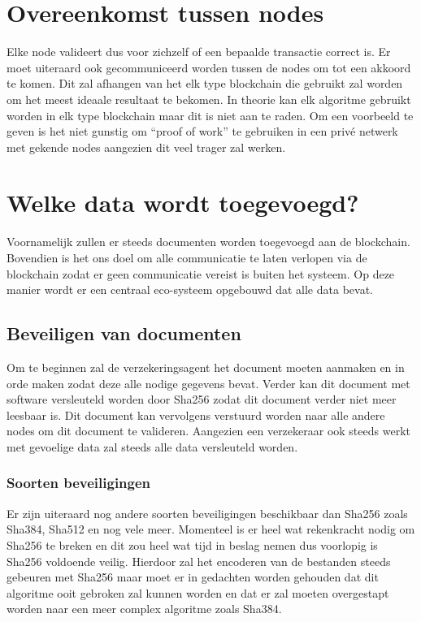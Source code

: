 \section{Overeenkomst tussen nodes}
Elke node valideert dus voor zichzelf of een bepaalde transactie correct is. Er moet uiteraard ook gecommuniceerd worden tussen de nodes om tot een akkoord te komen. Dit zal afhangen van het elk type blockchain die gebruikt zal worden om het meest ideaale resultaat te bekomen. In theorie kan elk algoritme gebruikt worden in elk type blockchain maar dit is niet aan te raden. Om een voorbeeld te geven is het niet gunstig om ``proof of work'' te gebruiken in een privé netwerk met gekende nodes aangezien dit veel trager zal werken.

\section{Welke data wordt toegevoegd?}
Voornamelijk zullen er steeds documenten worden toegevoegd aan de blockchain. Bovendien is het ons doel om alle communicatie te laten verlopen via de blockchain zodat er geen communicatie vereist is buiten het systeem. Op deze manier wordt er een centraal eco-systeem opgebouwd dat alle data bevat.

\subsection{Beveiligen van documenten}
Om te beginnen zal de verzekeringsagent het document moeten aanmaken en in orde maken zodat deze alle nodige gegevens bevat. Verder kan dit document met software versleuteld worden door Sha256 zodat dit document verder niet meer leesbaar is. Dit document kan vervolgens verstuurd worden naar alle andere nodes om dit document te valideren. Aangezien een verzekeraar ook steeds werkt met gevoelige data zal steeds alle data versleuteld worden. 

\subsubsection{Soorten beveiligingen}
Er zijn uiteraard nog andere soorten beveiligingen beschikbaar dan Sha256 zoals Sha384, Sha512 en nog vele meer. Momenteel is er heel wat rekenkracht nodig om Sha256 te breken en dit zou heel wat tijd in beslag nemen dus voorlopig is Sha256 voldoende veilig. Hierdoor zal het encoderen van de bestanden steeds gebeuren met Sha256 maar moet er in gedachten worden gehouden dat dit algoritme ooit gebroken zal kunnen worden en dat er zal moeten overgestapt worden naar een meer complex algoritme zoals Sha384. 

